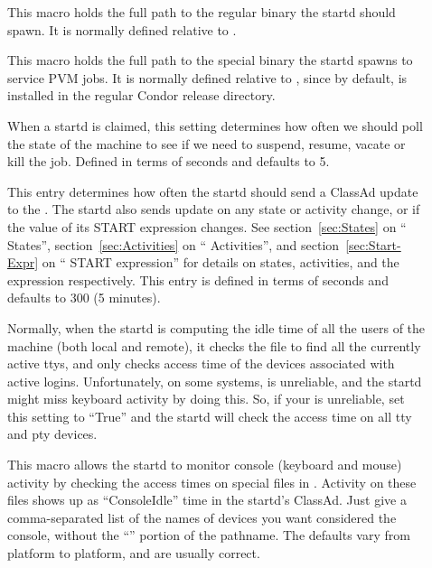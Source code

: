 \begin{description}

\item[] \label{param:Starter}  This macro holds the
  full path to the regular  binary the startd should 
  spawn.
  It is normally defined relative to .
  
\item[] \label{param:AlternateStarter1}
  This macro holds the full path to the special 
  binary the startd spawns to service PVM jobs.  It is normally
  defined relative to , since by default,
   is installed in the regular Condor release
  directory. 
  
\item[] \label{param:PollingInterval} When a
  startd is claimed, this setting determines how often we should poll
  the state of the machine to see if we need to suspend, resume,
  vacate or kill the job.  Defined in terms of seconds and defaults to
  5.
  
\item[] \label{param:UpdateInterval} This
  entry determines how often the startd should send a ClassAd update
  to the .  The startd also sends update on any
  state or activity change, or if the value of its START expression
  changes.  See section~\ref{sec:States} on ``
  States'', section~\ref{sec:Activities} on ``
  Activities'', and section~\ref{sec:Start-Expr} on ``
  START expression'' for details on states, activities, and the
   expression respectively.  This entry is defined in
  terms of seconds and defaults to 300 (5 minutes).
  
\item[] \label{param:StartdHasBadUtmp}
  Normally, when the startd is computing the idle time of all the
  users of the machine (both local and remote), it checks the
   file to find all the currently active ttys, and only
  checks access time of the devices associated with active logins.
  Unfortunately, on some systems,  is unreliable, and the
  startd might miss keyboard activity by doing this.  So, if your
   is unreliable, set this setting to ``True'' and the
  startd will check the access time on all tty and pty devices.
  
\item[] \label{param:ConsoleDevices} This
  macro allows the startd to monitor console (keyboard and mouse)
  activity by checking the access times on special files in
  .  Activity on these files shows up as ``ConsoleIdle''
  time in the startd's ClassAd.  Just give a comma-separated list of
  the names of devices you want considered the console, without the
  ``'' portion of the pathname.  The defaults vary from
  platform to platform, and are usually correct.  


\end{description}
